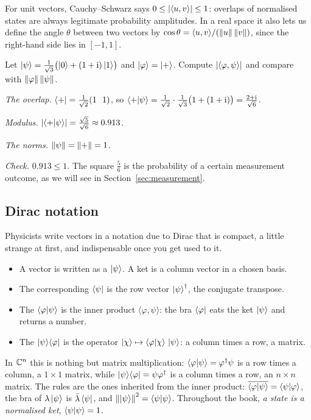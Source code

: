 For unit vectors, Cauchy--Schwarz says $0\le\left|\langle u,v\rangle\right|\le1$: overlaps of normalised states are always legitimate probability amplitudes. In a real space it also lets us define the angle $\theta$ between two vectors by $\cos\theta=\langle u,v\rangle/(\left\|u\right\|\left\|v\right\|)$, since the right-hand side lies in $[-1,1]$.

\begin{example}\label{ex:cs-qubit}
  Let $\left|\psi\right\rangle=\frac1{\sqrt3}\bigl(\left|0\right\rangle+(1+\mathrm{i})\left|1\right\rangle\bigr)$ and $\left|\varphi\right\rangle=\left|+\right\rangle$. Compute $\left|\langle\varphi,\psi\rangle\right|$ and compare with $\left\|\varphi\right\|\left\|\psi\right\|$.
\end{example}
\begin{solution}
  \begin{steps}
    \item \emph{The overlap.} $\left\langle+\right|=\tfrac1{\sqrt2}(1\ \ 1)$, so $\left\langle+\middle|\psi\right\rangle=\tfrac1{\sqrt2}\cdot\tfrac1{\sqrt3}\bigl(1+(1+\mathrm{i})\bigr)=\tfrac{2+\mathrm{i}}{\sqrt6}$.
    \item \emph{Modulus.} $\left|\left\langle+\middle|\psi\right\rangle\right|=\tfrac{\sqrt5}{\sqrt6}\approx0.913$.
    \item \emph{The norms.} $\left\|\psi\right\|=\left\|+\right\|=1$.
    \item \emph{Check.} $0.913\le1$. The square $\tfrac56$ is the probability of a certain measurement outcome, as we will see in Section~\ref{sec:measurement}.
  \end{steps}
\end{solution}

\subsection{Dirac notation}

Physicists write vectors in a notation due to Dirac that is compact, a little strange at first, and indispensable once you get used to it.

\begin{itemize}
  \item A vector is written as a  $\left|\psi\right\rangle$. A ket is a column vector in a chosen basis.
  \item The corresponding  $\left\langle\psi\right|$ is the row vector $\left|\psi\right\rangle^\dagger$, the conjugate transpose.
  \item The  $\left\langle\varphi\middle|\psi\right\rangle$ is the inner product $\langle\varphi,\psi\rangle$: the bra $\left\langle\varphi\right|$ eats the ket $\left|\psi\right\rangle$ and returns a number.
  \item The  $\left|\psi\right\rangle\!\left\langle\varphi\right|$ is the operator $\left|\chi\right\rangle\mapsto\left\langle\varphi\middle|\chi\right\rangle\,\left|\psi\right\rangle$: a column times a row, a matrix.
\end{itemize}
In $\mathbb{C}^n$ this is nothing but matrix multiplication: $\left\langle\varphi\middle|\psi\right\rangle=\varphi^\dagger\psi$ is a row times a column, a $1\times1$ matrix, while $\left|\psi\right\rangle\!\left\langle\varphi\right|=\psi\varphi^\dagger$ is a column times a row, an $n\times n$ matrix. The rules are the ones inherited from the inner product: $\overline{\left\langle\varphi\middle|\psi\right\rangle}=\left\langle\psi\middle|\varphi\right\rangle$, the bra of $\lambda\left|\psi\right\rangle$ is $\bar\lambda\left\langle\psi\right|$, and $\left\|\left|\psi\right\rangle\right\|^2=\left\langle\psi\middle|\psi\right\rangle$.
Throughout the book, \emph{a state is a normalised ket}, $\left\langle\psi\middle|\psi\right\rangle=1$.

